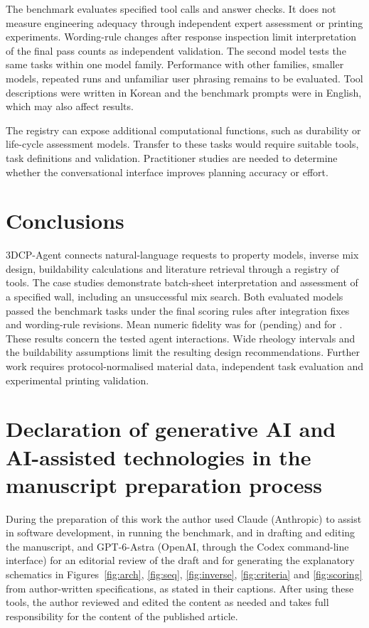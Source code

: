 \documentclass[preprint,12pt]{elsarticle}
\providecommand{\nbenchCxModel}{(pending)}
\begin{document}
The benchmark evaluates specified tool calls and answer checks. It does not measure engineering adequacy through independent expert assessment or printing experiments. Wording-rule changes after response inspection limit interpretation of the final pass counts as independent validation. The second model tests the same tasks within one model family. Performance with other families, smaller models, repeated runs and unfamiliar user phrasing remains to be evaluated. Tool descriptions were written in Korean and the benchmark prompts were in English, which may also affect results.

The registry can expose additional computational functions, such as durability or life-cycle assessment models. Transfer to these tasks would require suitable tools, task definitions and validation. Practitioner studies are needed to determine whether the conversational interface improves planning accuracy or effort.

\section{Conclusions}\label{sec:conclusion}

3DCP-Agent connects natural-language requests to \nnModels{} property models, inverse mix design, buildability calculations and literature retrieval through a registry of \nnTools{} tools. The case studies demonstrate batch-sheet interpretation and assessment of a specified wall, including an unsuccessful mix search. Both evaluated models passed the \nbenchCxN{} benchmark tasks under the final scoring rules after integration fixes and wording-rule revisions. Mean numeric fidelity was \nbenchCxFidelity{} for \nbenchCxModel{} and \nbenchCsFidelity{} for \nbenchCsModel{}. These results concern the tested agent interactions. Wide rheology intervals and the buildability assumptions limit the resulting design recommendations. Further work requires protocol-normalised material data, independent task evaluation and experimental printing validation.

\section*{Declaration of generative AI and AI-assisted technologies in the manuscript preparation process}
During the preparation of this work the author used Claude (Anthropic) to assist in software development, in running the benchmark, and in drafting and editing the manuscript, and GPT-6-Astra (OpenAI, through the Codex command-line interface) for an editorial review of the draft and for generating the explanatory schematics in Figures~\ref{fig:arch}, \ref{fig:seq}, \ref{fig:inverse}, \ref{fig:criteria} and \ref{fig:scoring} from author-written specifications, as stated in their captions. After using these tools, the author reviewed and edited the content as needed and takes full responsibility for the content of the published article.
\end{document}
